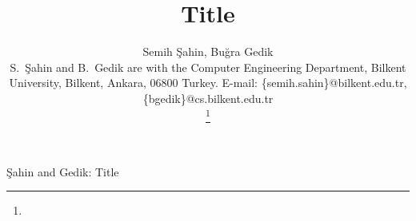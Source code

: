 



  \title{Title}

  \author
  {
    Semih \c{S}ahin,
    Bu\u{g}ra Gedik
    \IEEEcompsocitemizethanks
    {

      \IEEEcompsocthanksitem S.\ \c{S}ahin and B.\ Gedik
             are with the
             Computer Engineering Department, Bilkent
             University, Bilkent, Ankara, 06800 Turkey. E-mail:
             \{semih.sahin\}@bilkent.edu.tr, \{bgedik\}@cs.bilkent.edu.tr
    }%
    \thanks{}
  }

           {\c{Sahin} and Gedik: Title}
  \IEEEcompsoctitleabstractindextext{}
  \maketitle

  \IEEEpeerreviewmaketitle

  
  

  
  


